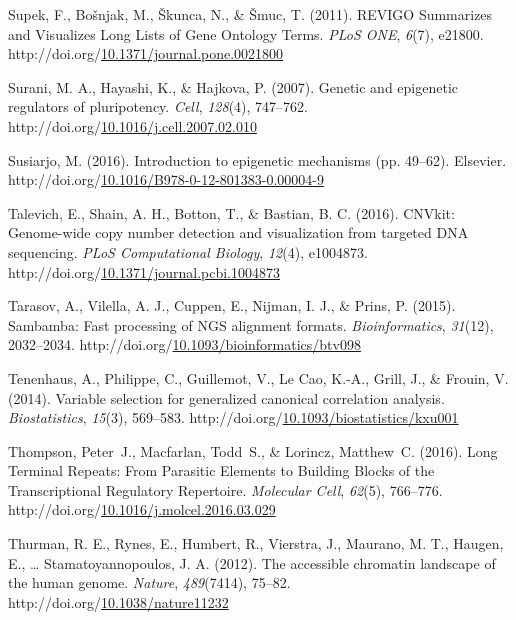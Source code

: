 \documentclass[12pt,twoside]{reedthesis}
\newlength{\cslhangindent}
\newenvironment{CSLReferences}[2] %
 {%
  \setlength{\parindent}{0pt}
  \ifodd #1 \everypar{\setlength{\hangindent}{\cslhangindent}}\ignorespaces\fi
  \ifnum #2 > 0
  \setlength{\parskip}{#2\baselineskip}
  \fi
 }%
 {}
\begin{document}
\begin{CSLReferences}{1}{0}
\leavevmode{}%
Supek, F., Bošnjak, M., Škunca, N., \& Šmuc, T. (2011). REVIGO Summarizes and Visualizes Long Lists of Gene Ontology Terms. \emph{PLoS ONE}, \emph{6}(7), e21800. http://doi.org/\href{https://doi.org/10.1371/journal.pone.0021800}{10.1371/journal.pone.0021800}

\leavevmode{}%
Surani, M. A., Hayashi, K., \& Hajkova, P. (2007). Genetic and epigenetic regulators of pluripotency. \emph{Cell}, \emph{128}(4), 747--762. http://doi.org/\href{https://doi.org/10.1016/j.cell.2007.02.010}{10.1016/j.cell.2007.02.010}

\leavevmode{}%
Susiarjo, M. (2016). Introduction to epigenetic mechanisms (pp. 49--62). Elsevier. http://doi.org/\href{https://doi.org/10.1016/B978-0-12-801383-0.00004-9}{10.1016/B978-0-12-801383-0.00004-9}

\leavevmode{}%
Talevich, E., Shain, A. H., Botton, T., \& Bastian, B. C. (2016). CNVkit: Genome-wide copy number detection and visualization from targeted DNA sequencing. \emph{PLoS Computational Biology}, \emph{12}(4), e1004873. http://doi.org/\href{https://doi.org/10.1371/journal.pcbi.1004873}{10.1371/journal.pcbi.1004873}

\leavevmode{}%
Tarasov, A., Vilella, A. J., Cuppen, E., Nijman, I. J., \& Prins, P. (2015). Sambamba: Fast processing of NGS alignment formats. \emph{Bioinformatics}, \emph{31}(12), 2032--2034. http://doi.org/\href{https://doi.org/10.1093/bioinformatics/btv098}{10.1093/bioinformatics/btv098}

\leavevmode{}%
Tenenhaus, A., Philippe, C., Guillemot, V., Le Cao, K.-A., Grill, J., \& Frouin, V. (2014). Variable selection for generalized canonical correlation analysis. \emph{Biostatistics}, \emph{15}(3), 569--583. http://doi.org/\href{https://doi.org/10.1093/biostatistics/kxu001}{10.1093/biostatistics/kxu001}

\leavevmode{}%
Thompson, Peter~J., Macfarlan, Todd~S., \& Lorincz, Matthew~C. (2016). Long Terminal Repeats: From Parasitic Elements to Building Blocks of the Transcriptional Regulatory Repertoire. \emph{Molecular Cell}, \emph{62}(5), 766--776. http://doi.org/\href{https://doi.org/10.1016/j.molcel.2016.03.029}{10.1016/j.molcel.2016.03.029}

\leavevmode{}%
Thurman, R. E., Rynes, E., Humbert, R., Vierstra, J., Maurano, M. T., Haugen, E., \ldots{} Stamatoyannopoulos, J. A. (2012). The accessible chromatin landscape of the human genome. \emph{Nature}, \emph{489}(7414), 75--82. http://doi.org/\href{https://doi.org/10.1038/nature11232}{10.1038/nature11232}


\end{CSLReferences}
\end{document}
